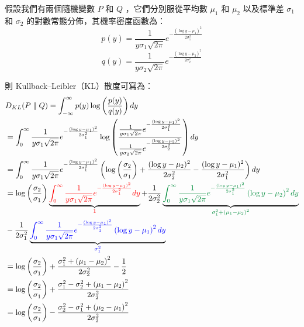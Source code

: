 \hspace*{8mm} 假設我們有兩個隨機變數 $P$ 和 $Q$ ，它們分別服從平均數 $\mu_1$ 和 $\mu_2$ 以及標準差 $\sigma_1$ 和 $\sigma_2$ 的對數常態分佈，其機率密度函數為：
{\small
\begin{equation}
p(y) = \frac{1}{y \sigma_1 \sqrt{2\pi}} e^{-\frac{(\log y - \mu_1)^2}{2\sigma_1^2}}
\end{equation}
\begin{equation}
q(y) = \frac{1}{y \sigma_2 \sqrt{2\pi}} e^{-\frac{(\log y - \mu_2)^2}{2\sigma_2^2}}
\end{equation}
}

則 Kullback–Leibler（KL）散度可寫為：
{\scriptsize
\begin{align*}
&D_{KL}(P\parallel Q)=\int_{-\infty}^{\infty}p(y)\log\left(\frac{p(y)}{q(y)}\right)dy\\
&=\int_{0}^{\infty}\frac{1}{y \sigma_1 \sqrt{2\pi}} e^{-\frac{(\log y - \mu_1)^2}{2\sigma_1^2}}\log\left(\frac{\frac{1}{y \sigma_1 \sqrt{2\pi}} e^{-\frac{(\log y - \mu_1)^2}{2\sigma_1^2}}}{\frac{1}{y \sigma_2 \sqrt{2\pi}} e^{-\frac{(\log y - \mu_2)^2}{2\sigma_2^2}}}\right)dy\\
&=\int_{0}^{\infty}\frac{1}{y \sigma_1 \sqrt{2\pi}} e^{-\frac{(\log y - \mu_1)^2}{2\sigma_1^2}}\left(\log\left(\frac{\sigma_2}{\sigma_1}\right)+\frac{(\log y - \mu_2)^2}{2\sigma_2^2}-\frac{(\log y - \mu_1)^2}{2\sigma_1^2}\right)dy\\
&=\log\left(\frac{\sigma_2}{\sigma_1}\right)\underbrace{\textcolor{red}{\int_{0}^{\infty}\frac{1}{y \sigma_1 \sqrt{2\pi}} e^{-\frac{(\log y - \mu_1)^2}{2\sigma_1^2}}dy}}_{\textcolor{red}{1}}+\frac{1}{2\sigma_2^2}\underbrace{\textcolor{PowerPointGreen}{\int_{0}^{\infty}\frac{1}{y \sigma_1 \sqrt{2\pi}} e^{-\frac{(\log y - \mu_1)^2}{2\sigma_1^2}}\left(\log y - \mu_2\right)^2dy}}_{\textcolor{PowerPointGreen}{\sigma_1^2+\left(\mu_1-\mu_2\right)^2}}\\
&-\frac{1}{2\sigma_1^2}\underbrace{\textcolor{blue}{\int_{0}^{\infty}\frac{1}{y \sigma_1 \sqrt{2\pi}} e^{-\frac{(\log y - \mu_1)^2}{2\sigma_1^2}}\left(\log y - \mu_1\right)^2dy}}_{\textcolor{blue}{\sigma_1^2}}\\
&=\log \left(\frac{\sigma_2}{\sigma_1}\right)+\frac{\sigma_1^2+\left(\mu_1-\mu_2\right)^2}{2\sigma_2^2}-\frac{1}{2}\\
&=\log \left(\frac{\sigma_2}{\sigma_1}\right)+\frac{\sigma_1^2-\sigma_2^2+\left(\mu_1-\mu_2\right)^2}{2\sigma_2^2}\\
&=\log \left(\frac{\sigma_2}{\sigma_1}\right)-\frac{\sigma_2^2-\sigma_1^2+\left(\mu_2-\mu_1\right)^2}{2\sigma_2^2}
\end{align*}
}

